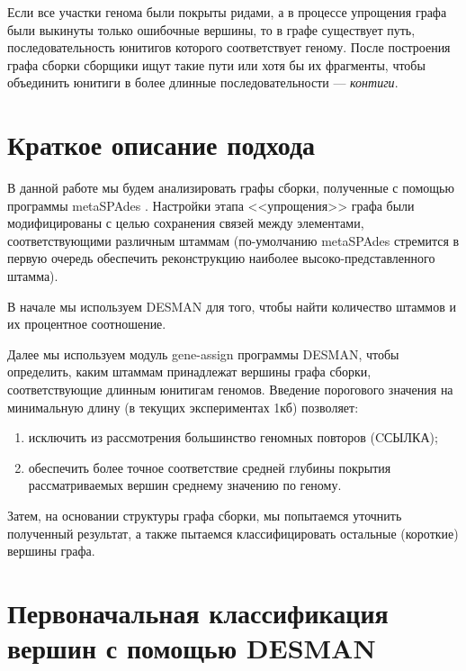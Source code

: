 \documentclass{spbau-diploma}
\begin{document}
Если все участки генома были покрыты ридами, а в процессе упрощения графа были выкинуты только ошибочные вершины, то в графе существует путь, последовательность юнитигов которого соответствует геному. После построения графа сборки сборщики ищут такие пути или хотя бы их фрагменты, чтобы объединить юнитиги в более длинные последовательности --- \textit{контиги}.




\section{Краткое описание подхода}

В данной работе мы будем анализировать графы сборки, полученные с помощью программы metaSPAdes \cite{MetaSpades}. Настройки этапа <<упрощения>> графа были модифицированы с целью сохранения связей между элементами, соответствующими различным штаммам (по-умолчанию metaSPAdes стремится в первую очередь обеспечить реконструкцию наиболее высоко-представленного штамма). 

В начале мы используем DESMAN для того, чтобы найти количество штаммов и их процентное соотношение. 

Далее мы используем модуль gene-assign программы DESMAN, чтобы определить, каким штаммам принадлежат вершины графа сборки, соответствующие длинным юнитигам геномов. Введение порогового значения на минимальную длину (в текущих экспериментах 1кб) позволяет: 
\begin{enumerate}
    \item исключить из рассмотрения большинство геномных повторов (CСЫЛКА);
    \item обеспечить более точное соответствие средней глубины покрытия рассматриваемых вершин среднему значению по геному.
\end{enumerate}
 
Затем, на основании структуры графа сборки, мы попытаемся уточнить полученный результат, а также  пытаемся классифицировать остальные (короткие) вершины графа.



\section{Первоначальная классификация вершин с помощью DESMAN}
\end{document}
